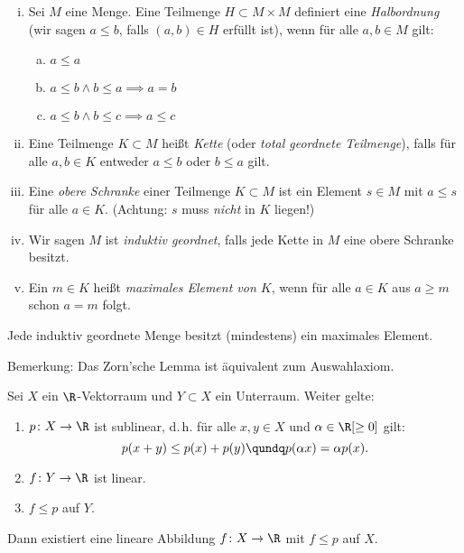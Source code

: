 \begin{thDef}\hfill
    \begin{enumerate}[i)]
        \item
            Sei $M$ eine Menge. Eine Teilmenge $H\subset M\times M$ definiert
            eine \emph{Halbordnung} (wir sagen $a\leq b$, falls $(a,b)\in H$ erfüllt
            ist), wenn für alle $a,b\in M$ gilt:
            \begin{enumerate}[a),labelsep=1em,leftmargin=1.3cm]
                \item $a\leq a$
                \item $a\leq b \wedge b\leq a \implies a=b$
                \item $a\leq b \wedge b\leq c \implies a\leq c$
            \end{enumerate}
        \item
            Eine Teilmenge $K\subset M$ heißt \emph{Kette} (oder \emph{total
            geordnete Teilmenge}), falls für alle $a,b\in K$ entweder $a\leq b$
            oder $b\leq a$ gilt.
        \item
            Eine \emph{obere Schranke} einer Teilmenge $K\subset M$ ist ein
            Element $s\in M$ mit $a\leq s$ für alle $a\in K$. (Achtung: $s$ muss
            \emph{nicht} in $K$ liegen!)
        \item
            Wir sagen $M$ ist \emph{induktiv geordnet}, falls jede Kette in $M$
            eine obere Schranke besitzt.
        \item
            Ein $m\in K$ heißt \emph{maximales Element von $K$}, wenn für alle $a\in K$
            aus $a\geq m$ schon $a=m$ folgt. 
    \end{enumerate}
\end{thDef}

\begin{thEmpty} \label{vl05:zorn}
    Jede induktiv geordnete Menge besitzt (mindestens) ein maximales Element.
    
    Bemerkung: Das Zorn'sche Lemma ist äquivalent zum Auswahlaxiom.
\end{thEmpty}

\begin{thSatz} \label{vl05:hahnbanach}
    Sei $X$ ein $\R$-Vektorraum und $Y\subset X$ ein Unterraum. Weiter gelte:
    \begin{enumerate}[(1)]
        \item 
            $p\colon X\to\R$ ist sublinear, d.\,h. für alle $x,y\in X$ und
            $\alpha\in\R[\geq0]$ gilt:
            \[ p(x+y) \leq p(x) + p(y) \qundq p(\alpha x) = \alpha p(x)  . \]
        \item
            $f\colon Y\to\R$ ist linear.
        \item
            $f\leq p$ auf $Y$.
    \end{enumerate}
    Dann existiert eine lineare Abbildung $f\colon X\to\R$ 
    mit $f\leq p$ auf $X$.
\end{thSatz}

